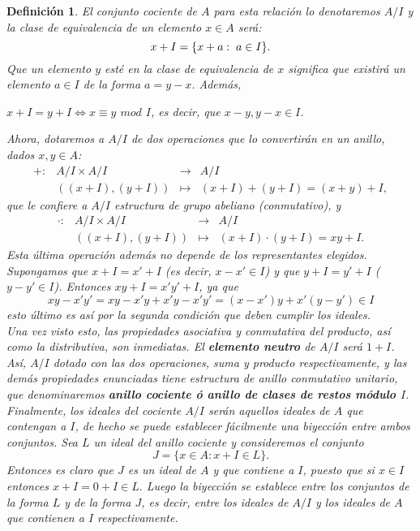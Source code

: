 \documentclass[12pt]{article}
\newtheorem{definition}[theorem]{Definición}
\begin{document}
\begin{definition}
El conjunto cociente de $A$ para esta relación lo denotaremos $A/I$ y la clase de equivalencia de un elemento $x \in A$ será: $$x + I = \lbrace x + a  : \hspace{0.1cm} a \in I \rbrace.$$
Que un elemento $y$ esté en la clase de equivalencia de $x$ significa que existirá un elemento $a \in I$ de la forma $a = y-x$. Además,\begin{center}
$x + I = y + I  \Leftrightarrow x \equiv y$ $mod$ $I$, es decir, que $x-y,y-x \in I$.
\end{center} 
Ahora, dotaremos a $A/I$ de dos operaciones que lo convertirán en un anillo, dados $x,y \in A$: 
$$\begin{array}{rccl}
+ \colon &A/I \times A/I&\longrightarrow & A/I\\
&((x + I),(y + I)) & \longmapsto &(x + I) + (y + I) = (x + y) + I,
\end{array}
$$ que le confiere a $A/I$ estructura de grupo abeliano (conmutativo), y
$$\begin{array}{rccl}
\cdot \colon &A/I \times A/I&\longrightarrow & A/I\\
&((x + I),(y + I)) & \longmapsto &(x + I)\cdot(y + I) = xy + I.
\end{array}
$$ Esta última operación además no depende de los representantes elegidos. Supongamos que $x + I = x' + I$ (es decir, $x-x' \in I$) y que $y + I = y' + I$ ($y-y' \in I$). Entonces $xy + I = x'y' + I$, ya que $$xy -x'y' = xy - x'y + x'y - x'y' = (x-x')y + x'(y-y') \in I$$ esto último es así por la segunda condición que deben cumplir los ideales.\vspace{0.2cm}\\
Una vez visto esto, las propiedades  asociativa y conmutativa del producto, así como la distributiva, son inmediatas. El \textbf{elemento neutro} de $A/I$ será $1 + I$. Así, $A/I$ dotado con las dos operaciones, suma y producto respectivamente, y las demás propiedades enunciadas tiene estructura de anillo conmutativo unitario, que denominaremos \textbf{anillo cociente ó anillo de clases de restos módulo $I$}.\vspace{0.2cm}\\
Finalmente, los ideales del cociente $A/I$ serán aquellos ideales de $A$ que contengan a $I$, de hecho se puede establecer fácilmente una biyección entre ambos conjuntos. Sea $L$ un ideal del anillo cociente y consideremos el conjunto $$J = \lbrace x \in A : x + I \in L \rbrace.$$ Entonces es claro que $J$ es un ideal de $A$ y que contiene a $I$, puesto que si $x \in I$ entonces $x + I = 0 + I \in L.$ Luego la biyección se establece entre los conjuntos de la forma $L$ y de la forma $J$, es decir, entre los ideales de $A/I$ y los ideales de $A$ que contienen a $I$ respectivamente.
\end{definition}
\end{document}
